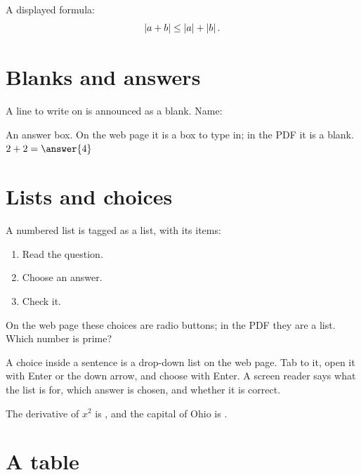 \documentclass{ximera}
\begin{document}
A displayed formula:
\[
\left\lvert a+b \right\rvert\le\left\lvert a \right\rvert+\left\lvert b \right\rvert.
\]

\section{Blanks and answers}

A line to write on is announced as a blank. Name: \xmblank[2in]

\begin{problem}
An answer box. On the web page it is a box to type in; in the PDF it is a
blank. $2+2=\answer{4}$
\end{problem}

\section{Lists and choices}

A numbered list is tagged as a list, with its items:

\begin{enumerate}
\item Read the question.
\item Choose an answer.
\item Check it.
\end{enumerate}

\begin{problem}
On the web page these choices are radio buttons; in the PDF they are a
list. Which number is prime?

\begin{multipleChoice}
\end{multipleChoice}
\end{problem}

\begin{problem}
A choice inside a sentence is a drop-down list on the web page. Tab to it,
open it with Enter or the down arrow, and choose with Enter. A screen reader
says what the list is for, which answer is chosen, and whether it is correct.

The derivative of $x^2$ is
,
and the capital of Ohio is
.
\end{problem}

\section{A table}
\end{document}
